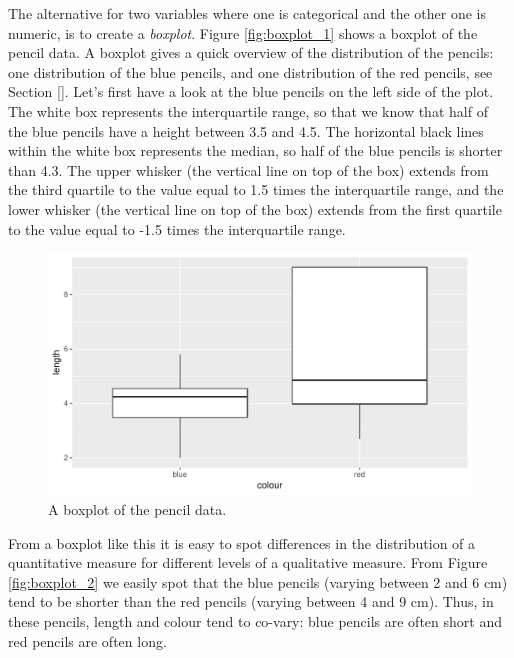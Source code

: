 \documentclass[]{report}\usepackage[]{graphicx}\usepackage[]{color}
\makeatletter
\def\maxwidth{ %
  \ifdim\Gin@nat@width>\linewidth
    \linewidth
  \else
    \Gin@nat@width
  \fi
}
\makeatother
\begin{document}
The alternative for two variables where one is categorical and the other one is numeric, is to create a \textit{boxplot}. Figure \ref{fig:boxplot_1} shows a boxplot of the pencil data. A boxplot gives a quick overview of the distribution of the pencils: one distribution of the blue pencils, and one distribution of the red pencils, see Section \ref{}. Let's first have a look at the blue pencils on the left side of the plot. The white box represents the interquartile range, so that we know that half of the blue pencils have a height between 3.5 and 4.5. The horizontal black lines within the white box represents the median, so half of the blue pencils is shorter than 4.3. The upper whisker (the vertical line on top of the box) extends from the third quartile to the value equal to 1.5 times the interquartile range, and the lower whisker (the vertical line on top of the box) extends from the first quartile to the value equal to -1.5 times the interquartile range.

\begin{figure}

{\centering \includegraphics[width=\maxwidth]{figure/crosstable_3-1} 

}

\caption[A boxplot of the pencil data]{A boxplot of the pencil data.}\label{fig:crosstable_3}
\end{figure}



From a boxplot like this it is easy to spot differences in the distribution of a quantitative measure for different levels of a qualitative measure. From Figure \ref{fig:boxplot_2} we easily spot that the blue pencils (varying between 2 and 6 cm) tend to be shorter than the red pencils (varying between 4 and 9 cm). Thus, in these pencils, length and colour tend to co-vary: blue pencils are often short and red pencils are often long.
\end{document}
